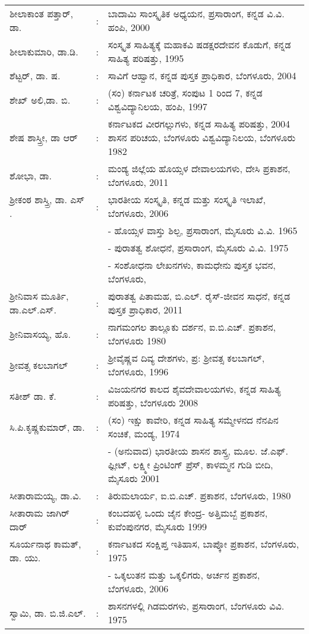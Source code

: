 \begin{longtable}[l]{@{}>{\raggedright}p{4.7cm}cp{9.2cm}<{\raggedright}@{}}
ಶೀಲಾಕಾಂತ ಪತ್ತಾರ್​, ಡಾ. & : &  ಬಾದಾಮಿ ಸಾಂಸ್ಕೃತಿಕ ಅಧ್ಯಯನ, ಪ್ರಸಾರಾಂಗ, ಕನ್ನಡ ವಿ.ವಿ. ಹಂಪಿ, 2000\\
ಶೀಲಾಕುಮಾರಿ, ಡಾ.ಡಿ. & : &  ಸಂಸ್ಕೃತ ಸಾಹಿತ್ಯಕ್ಕೆ ಮಹಾಕವಿ ಷಡಕ್ಷರದೇವನ ಕೊಡುಗೆ, ಕನ್ನಡ ಸಾಹಿತ್ಯ ಪರಿಷತ್ತು, 1995\\
ಶೆಟ್ಟರ್​, ಡಾ. ಷ. & : & ಸಾವಿಗೆ ಆಹ್ವಾನ, ಕನ್ನಡ ಪುಸ್ತಕ ಪ್ರಾಧಿಕಾರ, ಬೆಂಗಳೂರು, 2004\\
ಶೇಖ್​ ಅಲಿ,ಡಾ. ಬಿ. & : & (ಸಂ) ಕರ್ನಾಟಕ ಚರಿತ್ರೆ, ಸಂಪುಟ 1 ರಿಂದ 7, ಕನ್ನಡ ವಿಶ್ವವಿದ್ಯಾನಿಲಯ, ಹಂಪಿ, 1997\\
ಶೇಷ ಶಾಸ್ತ್ರೀ, ಡಾ ಆರ್​ & : & ಕರ್ನಾಟಕದ ವೀರಗಲ್ಲುಗಳು, ಕನ್ನಡ ಸಾಹಿತ್ಯ ಪರಿಷತ್ತು, 2004 ಶಾಸನ ಪರಿಚಯ, ಬೆಂಗಳೂರು ವಿಶ್ವವಿದ್ಯಾನಿಲಯ, ಬೆಂಗಳೂರು 1982\\
ಶೋಭಾ, ಡಾ. & : & ಮಂಡ್ಯ ಜಿಲ್ಲೆಯ ಹೊಯ್ಸಳ ದೇವಾಲಯಗಳು, ದೇಸಿ ಪ್ರಕಾಶನ, ಬೆಂಗಳೂರು, 2011\\
ಶ‍್ರೀಕಂಠ ಶಾಸ್ತ್ರಿ, ಡಾ. ಎಸ್​. & : & ಭಾರತೀಯ ಸಂಸ್ಕೃತಿ, ಕನ್ನಡ ಮತ್ತು ಸಂಸ್ಕೃತಿ ಇಲಾಖೆ, ಬೆಂಗಳೂರು, 2006\\
&& - ಹೊಯ್ಸಳ ವಾಸ್ತು ಶಿಲ್ಪ, ಪ್ರಸಾರಾಂಗ, ಮೈಸೂರು ವಿ.ವಿ. 1965\\
&& - ಪುರಾತತ್ವ ಶೋಧನೆ, ಪ್ರಸಾರಾಂಗ, ಮೈಸೂರು ವಿ.ವಿ. 1975\\
&& - ಸಂಶೋಧನಾ ಲೇಖನಗಳು, ಕಾಮಧೇನು ಪುಸ್ತಕ ಭವನ, ಬೆಂಗಳೂರು,\\
ಶ‍್ರೀನಿವಾಸ ಮೂರ್ತಿ, ಡಾ.ಎಲ್​.ಎಸ್​. & : &  ಪುರಾತತ್ವ ಪಿತಾಮಹ, ಬಿ.ಎಲ್​. ರೈಸ್​-ಜೀವನ ಸಾಧನೆ, ಕನ್ನಡ ಪುಸ್ತಕ ಪ್ರಾಧಿಕಾರ, 2011\\
ಶ‍್ರೀನಿವಾಸಯ್ಯ, ಹೊ.& : & ನಾಗಮಂಗಲ ತಾಲ್ಲೂಕು ದರ್ಶನ, ಐ.ಬಿ.ಎಚ್​. ಪ್ರಕಾಶನ, ಬೆಂಗಳೂರು 1980\\
ಶ‍್ರೀವತ್ಸ ಕಲಬಾಗಲ್​ & : &  ಶ‍್ರೀವೈಷ್ಣವ ದಿವ್ಯ ದೇಶಗಳು, ಪ್ರ: ಶ‍್ರೀವತ್ಸ ಕಲಬಾಗಲ್​, ಬೆಂಗಳೂರು, 1996\\
ಸತೀಶ್​ ಡಾ. ಕೆ. & : & ವಿಜಯನಗರ ಕಾಲದ ಶೈವದೇವಾಲಯಗಳು, ಕನ್ನಡ ಸಾಹಿತ್ಯ ಪರಿಷತ್ತು, ಬೆಂಗಳೂರು 2008\\
ಸಿ.ಪಿ.ಕೃಷ್ಣಕುಮಾರ್​, ಡಾ.& : & (ಸಂ) ಇಕ್ಷು ಕಾವೇರಿ, ಕನ್ನಡ ಸಾಹಿತ್ಯ ಸಮ್ಮೇಳನದ ನೆನಪಿನ ಸಂಚಿಕೆ, ಮಂಡ್ಯ, 1974\\
&& - (ಅನುವಾದ) ಭಾರತೀಯ ಶಾಸನ ಶಾಸ್ತ್ರ, ಮೂಲ. ಜೆ.ಎಫ್​. ಫ್ಲೀಟ್​, ಲಕ್ಷ್ಮೀ ಪ್ರಿಂಟಿಂಗ್​ ಪ್ರೆಸ್​, ಕಾಳಮ್ಮನ ಗುಡಿ ಬೀದಿ, ಮೈಸೂರು 2001\\
ಸೀತಾರಾಮಯ್ಯ, ಡಾ.ವಿ. & : & ತಿರುಮಲಾರ್ಯ, ಐ.ಬಿ.ಎಚ್​. ಪ್ರಕಾಶನ, ಬೆಂಗಳೂರು, 1980\\
ಸೀತಾರಾಮ ಜಾಗಿರ್​ದಾರ್​ & : & ಕಂಬದಹಳ್ಳಿ ಒಂದು ಜೈನ ಕೇಂದ್ರ- ಅತ್ತಿಮಬ್ಬೆ ಪ್ರಕಾಶನ, ಕುವೆಂಪುನಗರ, ಮೈಸೂರು 1999\\
ಸೂರ್ಯನಾಥ ಕಾಮತ್​, ಡಾ. ಯು. & : & ಕರ್ನಾಟಕದ ಸಂಕ್ಷಿಪ್ತ ಇತಿಹಾಸ, ಬಾಪ್ಕೋ ಪ್ರಕಾಶನ, ಬೆಂಗಳೂರು, 1975\\
&& - ಒಕ್ಕಲುತನ ಮತ್ತು ಒಕ್ಕಲಿಗರು, ಅರ್ಚನ ಪ್ರಕಾಶನ, ಬೆಂಗಳೂರು, 2006\\
ಸ್ವಾಮಿ, ಡಾ. ಬಿ.ಜಿ.ಎಲ್​. & : & ಶಾಸನಗಳಲ್ಲಿ ಗಿಡಮರಗಳು, ಪ್ರಸಾರಾಂಗ, ಬೆಂಗಳೂರು ವಿವಿ. 1975\\

\end{longtable}
